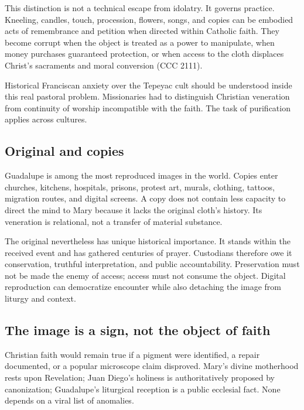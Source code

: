 This distinction is not a technical escape from idolatry. It governs practice. Kneeling, candles, touch, procession, flowers, songs, and copies can be embodied acts of remembrance and petition when directed within Catholic faith. They become corrupt when the object is treated as a power to manipulate, when money purchases guaranteed protection, or when access to the cloth displaces Christ's sacraments and moral conversion (CCC 2111).

Historical Franciscan anxiety over the Tepeyac cult should be understood inside this real pastoral problem. Missionaries had to distinguish Christian veneration from continuity of worship incompatible with the faith. The task of purification applies across cultures.

\subsection{Original and copies}

Guadalupe is among the most reproduced images in the world. Copies enter churches, kitchens, hospitals, prisons, protest art, murals, clothing, tattoos, migration routes, and digital screens. A copy does not contain less capacity to direct the mind to Mary because it lacks the original cloth's history. Its veneration is relational, not a transfer of material substance.

The original nevertheless has unique historical importance. It stands within the received event and has gathered centuries of prayer. Custodians therefore owe it conservation, truthful interpretation, and public accountability. Preservation must not be made the enemy of access; access must not consume the object. Digital reproduction can democratize encounter while also detaching the image from liturgy and context.


\subsection{The image is a sign, not the object of faith}

Christian faith would remain true if a pigment were identified, a repair documented, or a popular microscope claim disproved. Mary's divine motherhood rests upon Revelation; Juan Diego's holiness is authoritatively proposed by canonization; Guadalupe's liturgical reception is a public ecclesial fact. None depends on a viral list of anomalies.

